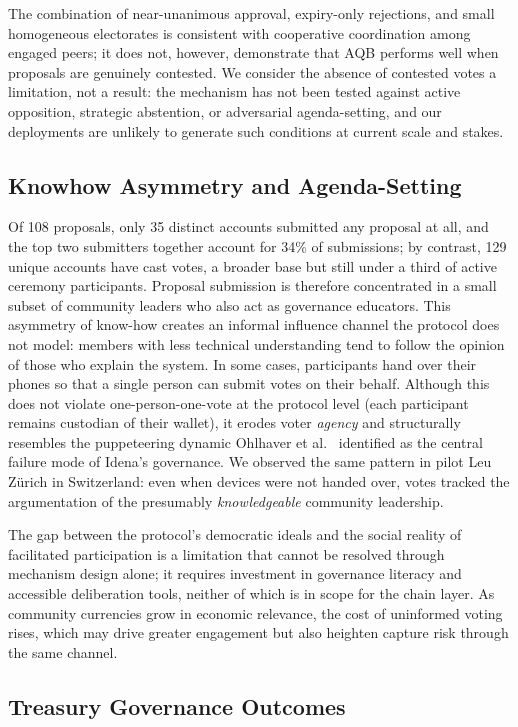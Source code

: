 \documentclass{svproc}
\begin{document}
The combination of near-unanimous approval, expiry-only rejections, and small homogeneous electorates is consistent with cooperative coordination among engaged peers; it does not, however, demonstrate that AQB performs well when proposals are genuinely contested. We consider the absence of contested votes a limitation, not a result: the mechanism has not been tested against active opposition, strategic abstention, or adversarial agenda-setting, and our deployments are unlikely to generate such conditions at current scale and stakes.

\subsection{Knowhow Asymmetry and Agenda-Setting}
\label{sec:knowhow}
Of 108 proposals, only 35 distinct accounts submitted any proposal at all, and the top two submitters together account for 34\% of submissions; by contrast, 129 unique accounts have cast votes, a broader base but still under a third of active ceremony participants. Proposal submission is therefore concentrated in a small subset of community leaders who also act as governance educators. This asymmetry of know-how creates an informal influence channel the protocol does not model: members with less technical understanding tend to follow the opinion of those who explain the system. In some cases, participants hand over their phones so that a single person can submit votes on their behalf. Although this does not violate one-person-one-vote at the protocol level (each participant remains custodian of their wallet), it erodes voter \emph{agency} and structurally resembles the puppeteering dynamic Ohlhaver et al.~\cite{ohlhaver2024proof} identified as the central failure mode of Idena's governance. We observed the same pattern in pilot Leu Z\"urich in Switzerland: even when devices were not handed over, votes tracked the argumentation of the presumably \emph{knowledgeable} community leadership.

The gap between the protocol's democratic ideals and the social reality of facilitated participation is a limitation that cannot be resolved through mechanism design alone; it requires investment in governance literacy and accessible deliberation tools, neither of which is in scope for the chain layer. As community currencies grow in economic relevance, the cost of uninformed voting rises, which may drive greater engagement but also heighten capture risk through the same channel.

\subsection{Treasury Governance Outcomes}
\label{sec:swap-results}
\end{document}
